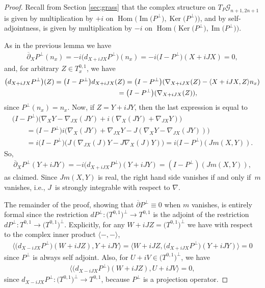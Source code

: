 \documentclass[10pt,a4paper]{amsart}
\numberwithin{equation}{section}
\newcommand{\cG}{{\mathcal G}}
\begin{document}
\begin{proof}Recall from Section \ref{sec;grass} that the complex structure on $T_P \cG_{n+1,2n+1}$ is given by multiplication by $+i$ on $\operatorname{Hom}\big(\operatorname{Im}\big(P^\perp\big), \operatorname{Ker}\big(P^\perp\big)\big)$, and by self-adjointness, is given by multiplication by $-i$ on $\operatorname{Hom}\big(\operatorname{Ker}\big(P^\perp\big),\operatorname{Im}\big(P^\perp\big)\big)$.

As in the previous lemma we have
\begin{gather*}
 \overline{\partial}_X P^\perp (n_x) = -i \big( d_{X+iJX} P^\perp \big) (n_x) = -i \big(I-P^\perp\big)(X+iJX) = 0,
\end{gather*}
and, for arbitrary $Z \in T^{0,1}_x$, we have
\begin{gather*}
\big( d_{X+iJX} P^\perp \big) (Z) = \big(I-P^\perp\big) d_{X+iJX} (Z)= \big(I-P^\perp\big) ( \nabla_{X+iJX} (Z) - \langle X+iJX, Z \rangle n_x ) \\
\hphantom{\big( d_{X+iJX} P^\perp \big) (Z)}{} = \big(I-P^\perp\big) ( \nabla_{X+iJX} (Z) ),
 \end{gather*}
 since $P^\perp(n_x) = n_x$. Now, if $Z= Y+iJY$, then the last expression is equal to
 \begin{gather*}
 \big(I -P^\perp\big) \big( \nabla_X Y - \nabla_{JX} (JY) + i ( \nabla_X(JY) + \nabla_{JX} Y ) \big) \\
 \qquad{} = \big(I -P^\perp\big) i \big( \nabla_X(JY) + \nabla_{JX} Y - J(\nabla_X Y - \nabla_{JX} (JY)) \big) \\
 \qquad {}= i \big(I -P^\perp\big) \big( J ( \nabla_{JX} (J) Y - J\nabla_X(J) Y ) \big) = i \big(I - P^\perp\big) ( J m(X,Y) ).
\end{gather*}
 So,
\begin{gather*}
\overline{\partial}_X P^\perp (Y+iJY) = -i \big( d_{X+iJX} P^\perp \big) (Y + iJY) = ( I - P^\perp) ( J m(X,Y) ),
\end{gather*}
as claimed. Since $ J m(X,Y)$ is real, the right hand side vanishes if and only if~$m$ vanishes, i.e., $J $~is strongly integrable with respect to $\nabla$.

The remainder of the proof, showing that $\overline{\partial} P^\perp \equiv 0$ when $m$ vanishes, is entirely formal since the restriction $dP^\perp\colon \big(T^{0,1}\big)^\perp \to T^{0,1}$ is the adjoint of the restriction $dP^\perp\colon T^{0,1} \to \big(T^{0,1}\big)^\perp$. Explicitly, for any $W + i JZ = \big(T^{0,1}\big)^\perp$ we have with respect to the complex inner product $\langle - , - \rangle$,
\begin{gather*}
\big\langle \big( d_{X-iJX} P^\perp \big) (W+iJZ) , Y+i JY \big\rangle
= \big\langle W+iJZ , \big( d_{X+iJX} P^\perp \big)( Y+i JY )\big\rangle = 0
\end{gather*}
since $P^\perp$ is always self adjoint. Also, for $U + iV \in \big(T^{0,1}\big)^\perp$, we have
\begin{gather*}
\big\langle \big( d_{X-iJX} P^\perp \big) (W+iJZ) , U+iJV \big\rangle = 0,
\end{gather*}
since $d_{X-iJX} P^\perp \colon \big(T^{0,1}\big)^\perp \to T^{0,1}$, because $P^\perp$ is a projection operator.
\end{proof}
\end{document}
